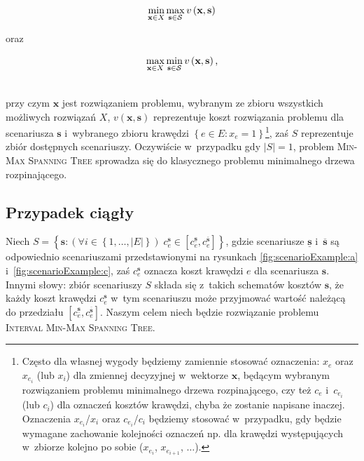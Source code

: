 \noindent\begin{minipage}{.3\linewidth}
	\begin{equation}\label{eq:minmax}
		\min_{ \mathclap{\textbf{x} \in X}} \max_{ \mathclap{\textbf{s} \in \mathcal{S}}} v \left( \textbf{x}, \textbf{s} \right)
	\end{equation}
\end{minipage}%
\begin{minipage}{.3\linewidth}
	\centering
	oraz
\end{minipage}%
\begin{minipage}{.3\linewidth}
	\begin{equation}\label{eq:maxmin}
	\max_{ \mathclap{\textbf{x} \in X}} \min_{ \mathclap{\textbf{s} \in \mathcal{S}}} v \left( \textbf{x}, \textbf{s} \right) \text{,}
	\end{equation}
\end{minipage}
\vspace{5px}
\\
przy czym $\textbf{x}$ jest rozwiązaniem problemu, wybranym ze zbioru wszystkich możliwych rozwiązań $X$, $v \left( \textbf{x}, \textbf{s} \right)$ reprezentuje koszt rozwiązania problemu dla scenariusza $\textbf{s}$ i~wybranego zbioru krawędzi $\left\{ e \in E : x_{e} = 1 \right\}$\footnote{
	Często dla własnej wygody będziemy zamiennie stosować oznaczenia: $x_{e}$ oraz $x_{e_{i}}$ (lub $x_{i}$) dla zmiennej decyzyjnej w~wektorze $\textbf{x}$, będącym wybranym rozwiązaniem problemu minimalnego drzewa rozpinającego, czy też $c_{e}$ i~$c_{e_{i}}$ (lub $c_{i}$) dla oznaczeń kosztów krawędzi, chyba że zostanie napisane inaczej.
	Oznaczenia $x_{e_{i}}$/$x_{i}$ oraz $c_{e_{i}}$/$c_{i}$ będziemy stosować w~przypadku, gdy będzie wymagane zachowanie kolejności oznaczeń np. dla krawędzi występujących w~zbiorze kolejno po sobie ($x_{e_{i}}$, $x_{e_{i+1}}$, $\dots$).
}, zaś $S$ reprezentuje zbiór dostępnych scenariuszy.
Oczywiście w~przypadku gdy $\left| S \right| = 1$, problem \textsc{Min-Max Spanning Tree} sprowadza się do klasycznego problemu minimalnego drzewa rozpinającego.



\subsection{Przypadek ciągły}



Niech $S = \left\{ \textbf{s} : \left( \forall i \in \left\{ 1, \dots, \left| E \right| \right\} \right) \; c^{\textbf{s}}_{e} \in \left[ c^{\underline{\textbf{s}}}_{e}, c^{\overline{\textbf{s}}}_{e} \right] \right\}$, gdzie scenariusze $\underline{\textbf{s}}$ i~$\overline{\textbf{s}}$ są odpowiednio scenariuszami przedstawionymi na rysunkach \ref{fig:scenarioExample:a} i~\ref{fig:scenarioExample:c}, zaś $c^{\textbf{s}}_{e}$ oznacza koszt krawędzi $e$ dla scenariusza $\textbf{s}$.
Innymi słowy: zbiór scenariuszy $S$ składa się z~takich schematów kosztów $\textbf{s}$, że każdy koszt krawędzi $c^{\textbf{s}}_{e}$ w~tym scenariuszu może przyjmować wartość należącą do przedziału $\left[ c^{\underline{\textbf{s}}}_{e}, c^{\overline{\textbf{s}}}_{e} \right]$.
Naszym celem niech będzie rozwiązanie problemu \textsc{Interval Min-Max Spanning Tree}.

